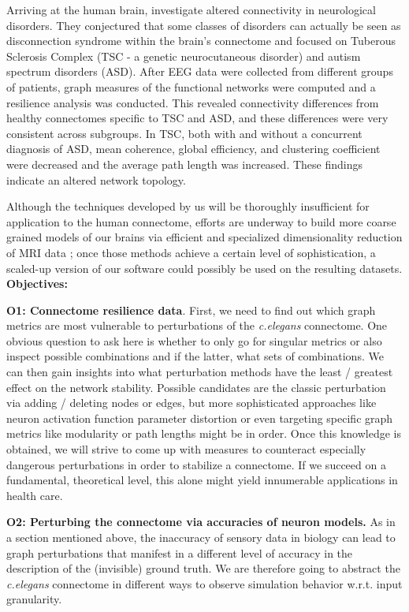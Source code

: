 \documentclass[a4paper,11pt]{article}
\begin{document}
Arriving at the human brain, \citep{Peters2013BrainFunctionalNetworks} investigate altered connectivity in neurological disorders. They conjectured that some classes of disorders can actually be seen as disconnection syndrome within the brain's connectome and focused on Tuberous Sclerosis Complex (TSC - a genetic neurocutaneous disorder) and autism spectrum disorders (ASD). After EEG data were collected from different groups of patients, graph measures of the functional networks were computed and a resilience analysis was conducted. This revealed connectivity differences from healthy connectomes specific to TSC and ASD, and these differences were very consistent across subgroups. In TSC, both with and without a concurrent diagnosis of ASD, mean coherence, global efficiency, and clustering coefficient were decreased and the average path length was increased. These findings indicate an altered network topology. 

Although the techniques developed by us will be thoroughly insufficient for application to the human connectome, efforts are underway to build more coarse grained models of our brains via efficient and specialized dimensionality reduction of MRI data \citep{Ye2015}; once those methods achieve a certain level of sophistication, a scaled-up version of our software could possibly be used on the resulting datasets.
\\[0,2cm]


\textbf{Objectives:}

\textbf{O1: Connectome resilience data}. First, we need to find out which graph metrics are most vulnerable to perturbations of the \emph{c.elegans} connectome. One obvious question to ask here is whether to only go for singular metrics or also inspect possible combinations and if the latter, what sets of combinations. We can then gain insights into what perturbation methods have the least / greatest effect on the network stability. Possible candidates are the classic perturbation via adding / deleting nodes or edges, but more sophisticated approaches like neuron activation function parameter distortion or even targeting specific graph metrics like modularity or path lengths might be in order. Once this knowledge is obtained, we will strive to come up with measures to counteract especially dangerous perturbations in order to stabilize a connectome. If we succeed on a fundamental, theoretical level, this alone might yield innumerable applications in health care.

\textbf{O2: Perturbing the connectome via accuracies of neuron models.} As in a section mentioned above, the inaccuracy of sensory data in biology can lead to graph perturbations that manifest in a different level of accuracy in the description of the (invisible) ground truth. We are therefore going to abstract the \emph{c.elegans} connectome in different ways to observe simulation behavior w.r.t. input granularity.
\end{document}
